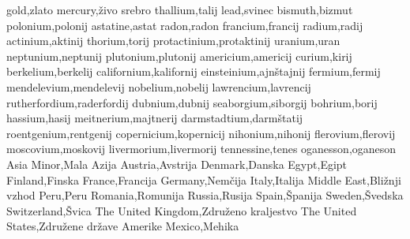 gold,zlato
mercury,živo srebro
thallium,talij
lead,svinec
bismuth,bizmut
polonium,polonij
astatine,astat
radon,radon
francium,francij
radium,radij
actinium,aktinij
thorium,torij
protactinium,protaktinij
uranium,uran
neptunium,neptunij
plutonium,plutonij
americium,americij
curium,kirij
berkelium,berkelij
californium,kalifornij
einsteinium,ajnštajnij
fermium,fermij
mendelevium,mendelevij
nobelium,nobelij
lawrencium,lavrencij
rutherfordium,raderfordij
dubnium,dubnij
seaborgium,siborgij
bohrium,borij
hassium,hasij
meitnerium,majtnerij
darmstadtium,darmštatij
roentgenium,rentgenij
copernicium,kopernicij
nihonium,nihonij
flerovium,flerovij
moscovium,moskovij
livermorium,livermorij
tennessine,tenes
oganesson,oganeson
Asia Minor,Mala Azija
Austria,Avstrija
Denmark,Danska
Egypt,Egipt
Finland,Finska
France,Francija
Germany,Nemčija
Italy,Italija
Middle East,Bližnji vzhod
Peru,Peru
Romania,Romunija
Russia,Rusija
Spain,Španija
Sweden,Švedska
Switzerland,Švica
The United Kingdom,Združeno kraljestvo
The United States,Združene države Amerike
Mexico,Mehika
